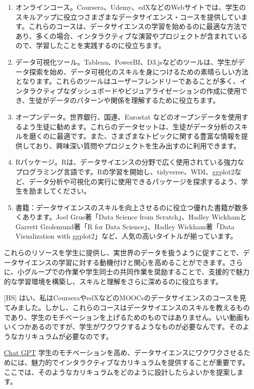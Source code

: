 \documentclass[
]{book}
\theoremstyle{definition}
\theoremstyle{definition}
\theoremstyle{definition}
\theoremstyle{definition}
\theoremstyle{remark}
\begin{document}
\begin{enumerate}
\def\labelenumi{\arabic{enumi}.}
\item
  オンラインコース。Coursera、Udemy、edXなどのWebサイトでは、学生のスキルアップに役立つさまざまなデータサイエンス・コースを提供しています。これらのコースは、データサイエンスの学習を始めるのに最適な方法であり、多くの場合、インタラクティブな演習やプロジェクトが含まれているので、学習したことを実践するのに役立ちます。
\item
  データ可視化ツール。Tableau、PowerBI、D3.jsなどのツールは、学生がデータ探索を始め、データ可視化のスキルを身につけるための素晴らしい方法となります。これらのツールはユーザーフレンドリーであることが多く、インタラクティブなダッシュボードやビジュアライゼーションの作成に使用でき、生徒がデータのパターンや関係を理解するために役立ちます。
\item
  オープンデータ。世界銀行、国連、Eurostat などのオープンデータを使用するよう生徒に勧めます。これらのデータセットは、生徒がデータ分析のスキルを磨くのに最適です。また、さまざまなトピックに関する豊富な情報を提供しており、興味深い質問やプロジェクトを生み出すのに利用できます。
\item
  Rパッケージ。Rは、データサイエンスの分野で広く使用されている強力なプログラミング言語です。Rの学習を開始し、tidyverse、WDI、ggplot2など、データ分析や可視化の実行に使用できるパッケージを探求するよう、学生を励ましてください。
\item
  書籍：データサイエンスのスキルを向上させるのに役立つ優れた書籍が数多くあります。Joel Grus著「Data Science from Scratch」、Hadley WickhamとGarrett Grolemund著「R for Data Science」、Hadley Wickham著「Data Visualization with ggplot2」など、人気の高いタイトルが揃っています。
\end{enumerate}

これらのリソースを学生に提供し、実世界のデータを扱うように促すことで、データサイエンスの学習に対する動機付けと関心を高めることができます。さらに、小グループでの作業や学生同士の共同作業を奨励することで、支援的で魅力的な学習環境を構築し、スキルと理解をさらに深めるのに役立ちます。

{[}HS{]} はい、私はCourseraやedXなどのMOOCsのデータサイエンスのコースを見てみました。しかし、これらのコースはデータサイエンスのスキルを教えるものであり、学生のモチベーションを上げるためのものではありません。いい動画もいくつかあるのですが、学生がワクワクするようなものが必要なんです。そのようなカリキュラムが必要なのです。

\protect\hyperlink{chatgpt}{Chat GPT} 学生のモチベーションを高め、データサイエンスにワクワクさせるためには、魅力的でインタラクティブなカリキュラムを提供することが重要です。ここでは、そのようなカリキュラムをどのように設計したらよいかを提案します。
\end{document}
